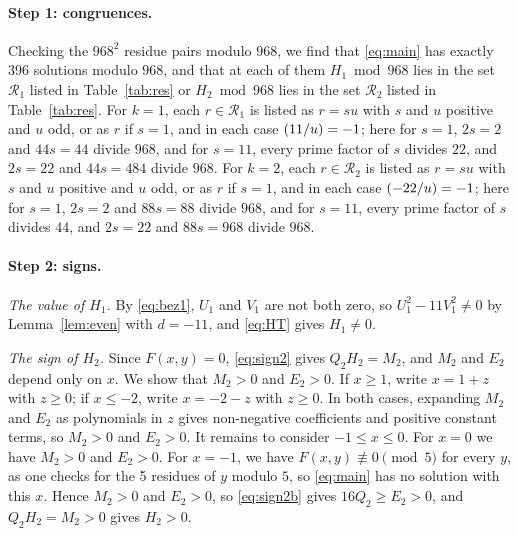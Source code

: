 \documentclass[11pt]{article}
\newcommand{\leg}[2]{\mathchoice{\biggl(\dfrac{#1}{#2}\biggr)}{(#1/#2)}{(#1/#2)}{(#1/#2)}}
\begin{document}
\paragraph{Step 1: congruences.} Checking the $968^2$ residue pairs modulo $968$, we find that \eqref{eq:main} has exactly 396 solutions modulo $968$, and that at each of them $H_{1}\bmod 968$ lies in the set $\mathcal R_{1}$ listed in Table~\ref{tab:res} or $H_{2}\bmod 968$ lies in the set $\mathcal R_{2}$ listed in Table~\ref{tab:res}. For $k=1$, each $r\in\mathcal R_{1}$ is listed as $r=su$ with $s$ and $u$ positive and $u$ odd, or as $r$ if $s=1$, and in each case $\leg{11}{u}=-1$; here for $s=1$, $2s=2$ and $44s=44$ divide $968$, and for $s=11$, every prime factor of $s$ divides $22$, and $2s=22$ and $44s=484$ divide $968$. For $k=2$, each $r\in\mathcal R_{2}$ is listed as $r=su$ with $s$ and $u$ positive and $u$ odd, or as $r$ if $s=1$, and in each case $\leg{-22}{u}=-1$; here for $s=1$, $2s=2$ and $88s=88$ divide $968$, and for $s=11$, every prime factor of $s$ divides $44$, and $2s=22$ and $88s=968$ divide $968$.

\paragraph{Step 2: signs.} \emph{The value of $H_{1}$.} By \eqref{eq:bez1}, $U_{1}$ and $V_{1}$ are not both zero, so $U_{1}^2-11V_{1}^2\neq0$ by Lemma~\ref{lem:even} with $d=-11$, and \eqref{eq:HT} gives $H_{1}\neq0$.

\emph{The sign of $H_{2}$.} Since $F(x,y)=0$, \eqref{eq:sign2} gives $Q_{2}H_{2}=M_{2}$, and $M_{2}$ and $E_{2}$ depend only on $x$. We show that $M_{2}>0$ and $E_{2}>0$. If $x\geq1$, write $x=1+z$ with $z\geq0$; if $x\leq-2$, write $x=-2-z$ with $z\geq0$. In both cases, expanding $M_{2}$ and $E_{2}$ as polynomials in $z$ gives non-negative coefficients and positive constant terms, so $M_{2}>0$ and $E_{2}>0$. It remains to consider $-1\leq x\leq0$. For $x=0$ we have $M_{2}>0$ and $E_{2}>0$. For $x=-1$, we have $F(x,y)\not\equiv0\pmod{5}$ for every $y$, as one checks for the 5 residues of $y$ modulo $5$, so \eqref{eq:main} has no solution with this $x$. Hence $M_{2}>0$ and $E_{2}>0$, so \eqref{eq:sign2b} gives $16Q_{2}\geq E_{2}>0$, and $Q_{2}H_{2}=M_{2}>0$ gives $H_{2}>0$.
\end{document}

